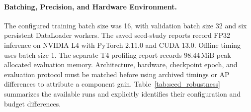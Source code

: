 

\paragraph{Batching, Precision, and Hardware Environment.}
The configured training batch size was 16, with validation batch size 32 and six persistent DataLoader workers. The saved seed-study reports record FP32 inference on NVIDIA L4 with PyTorch 2.11.0 and CUDA 13.0. Offline timing uses batch size 1. The separate T4 profiling report records $98.44\,\text{MiB}$ peak allocated evaluation memory. Architecture, hardware, checkpoint epoch, and evaluation protocol must be matched before using archived timings or AP differences to attribute a component gain. Table~\ref{tab:seed_robustness} summarizes the available runs and explicitly identifies their configuration and budget differences.
